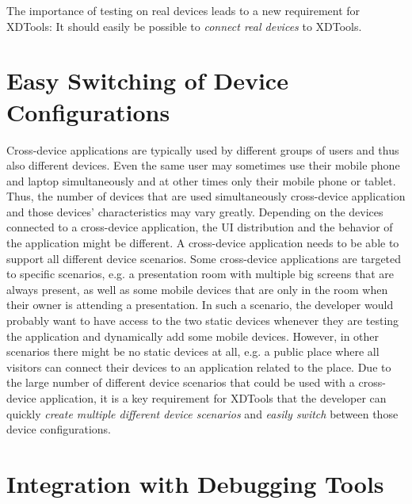 The importance of testing on real devices leads to a new requirement for XDTools: It should easily be possible to \emph{connect real devices} to XDTools. 

\section{Easy Switching of Device Configurations}

Cross-device applications are typically used by different groups of users and thus also different devices. Even the same user may sometimes use their mobile phone and laptop simultaneously and at other times only their mobile phone or tablet. Thus, the number of devices that are used simultaneously cross-device application and those devices' characteristics may vary greatly. Depending on the devices connected to a cross-device application, the UI distribution and the behavior of the application might be different. A cross-device application needs to be able to support all different device scenarios. Some cross-device applications are targeted to specific scenarios, e.g. a presentation room with multiple big screens that are always present, as well as some mobile devices that are only in the room when their owner is attending a presentation. In such a scenario, the developer would probably want to have access to the two static devices whenever they are testing the application and dynamically add some mobile devices. However, in other scenarios there might be no static devices at all, e.g. a public place where all visitors can connect their devices to an application related to the place. Due to the large number of different device scenarios that could be used with a cross-device application, it is a key requirement for XDTools that the developer can quickly \emph{create multiple different device scenarios} and \emph{easily switch} between those device configurations. 

\section{Integration with Debugging Tools}

